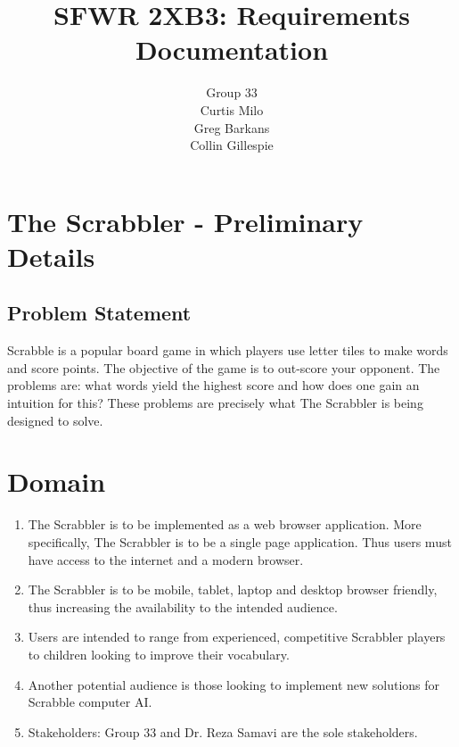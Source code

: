 \documentclass[12pt, oneside]{article}
\title{SFWR 2XB3: Requirements Documentation}
\author{Group 33 \\ 
	     Curtis Milo \\
	     Greg Barkans \\
	     Collin Gillespie \\
	     }
\date{}
\begin{document}
\maketitle
\newpage


\section{The Scrabbler - Preliminary Details}
\subsection{Problem Statement}
Scrabble is a popular board game in which players use letter tiles to make words and score points.  The objective of the game is to out-score your opponent.  The problems are: what words yield the highest score and how does one gain an intuition for this?  These problems are precisely what The Scrabbler is being designed to solve.


\section{Domain}
\begin{enumerate}[1.]
	\item The Scrabbler is to be implemented as a web browser application.  More specifically, The 		Scrabbler is to be a single page application.  Thus users must have access to the internet 		and a modern browser.    
	\item The Scrabbler is to be mobile, tablet, laptop and desktop browser friendly, thus increasing 		the availability to the intended audience.
	\item Users are intended to range from experienced, competitive Scrabbler players to children 			looking to improve their vocabulary.
	\item Another potential audience is those looking to implement new solutions for Scrabble 			computer AI.
	\item Stakeholders: Group 33 and Dr. Reza Samavi are the sole stakeholders.  
\end{enumerate}
\end{document}
